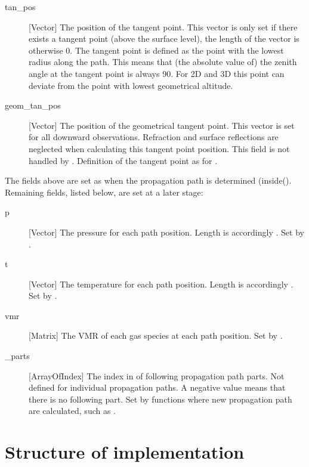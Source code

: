 \begin{description}
   \item[tan\_pos] [Vector] The position of the tangent point. This
     vector is only set if there exists a tangent point (above the
     surface level), the length of the vector is otherwise 0. The
     tangent point is defined as the point with the lowest radius
     along the path. This means that (the absolute value of) the
     zenith angle at the tangent point is always 90\degree. For 2D
     and 3D this point can deviate from the point with lowest
     geometrical altitude.
     
   \item[geom\_tan\_pos] [Vector] The position of the geometrical
     tangent point. This vector is set for all downward observations.
     Refraction and surface reflections are neglected when calculating
     this tangent point position. This field is not handled by
     . Definition of the tangent point
     as for .
\end{description}

The fields above are set as when the propagation path is determined
(inside(). Remaining fields, listed below, are
set at a later stage:

\begin{description}

\item[p] [Vector] The pressure for each path position. Length is
  accordingly . Set by .

\item[t] [Vector] The temperature for each path position. Length is
  accordingly . Set by .
  
\item[vmr] [Matrix] The VMR of each gas species at each path
  position. Set by .
  
\item[\next\_parts] [ArrayOfIndex] The index in
   of following propagation path parts. Not
  defined for individual propagation paths. A negative value means
  that there is no following part.
  Set by functions where new propagation path are calculated, such as
  .
\end{description}


\section{Structure of implementation}
\label{sec:ppath:structure}

